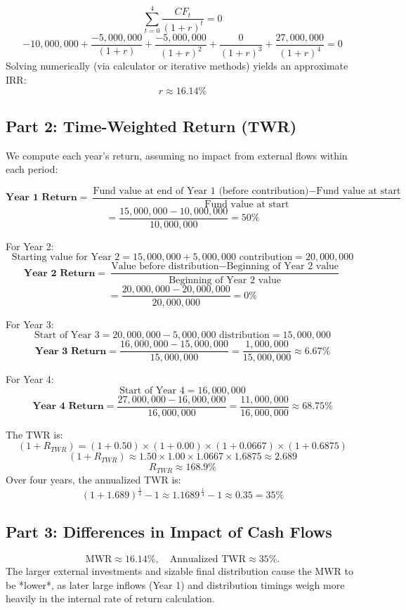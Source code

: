 \[
\sum_{t=0}^{4} \frac{CF_{t}}{(1 + r)^{t}} = 0
\]
\[
-10{,}000{,}000 + \frac{-5{,}000{,}000}{(1 + r)} + \frac{-5{,}000{,}000}{(1 + r)^{2}} + \frac{0}{(1 + r)^{3}} + \frac{27{,}000{,}000}{(1 + r)^{4}} = 0
\]
Solving numerically (via calculator or iterative methods) yields an approximate IRR:
\[
r \approx 16.14\%
\]

\subsection*{Part 2: Time-Weighted Return (TWR)}

We compute each year’s return, assuming no impact from external flows within each period:

\[
\textbf{Year 1 Return} = \frac{\text{Fund value at end of Year 1 (before contribution)} - \text{Fund value at start}}{\text{Fund value at start}}
\]
\[
= \frac{15{,}000{,}000 - 10{,}000{,}000}{10{,}000{,}000} = 50\%
\]

For Year 2:
\[
\text{Starting value for Year 2} = 15{,}000{,}000 + 5{,}000{,}000 \text{ contribution} = 20{,}000{,}000
\]
\[
\textbf{Year 2 Return} = \frac{\text{Value before distribution} - \text{Beginning of Year 2 value}}{\text{Beginning of Year 2 value}}
\]
\[
= \frac{20{,}000{,}000 - 20{,}000{,}000}{20{,}000{,}000} = 0\%
\]

For Year 3:
\[
\text{Start of Year 3} = 20{,}000{,}000 - 5{,}000{,}000 \text{ distribution} = 15{,}000{,}000
\]
\[
\textbf{Year 3 Return} = \frac{16{,}000{,}000 - 15{,}000{,}000}{15{,}000{,}000} = \frac{1{,}000{,}000}{15{,}000{,}000} \approx 6.67\%
\]

For Year 4:
\[
\text{Start of Year 4} = 16{,}000{,}000
\]
\[
\textbf{Year 4 Return} = \frac{27{,}000{,}000 - 16{,}000{,}000}{16{,}000{,}000} = \frac{11{,}000{,}000}{16{,}000{,}000} \approx 68.75\%
\]

The TWR is:
\[
(1 + R_{TWR}) = (1 + 0.50) \times (1 + 0.00) \times (1 + 0.0667) \times (1 + 0.6875)
\]
\[
(1 + R_{TWR}) \approx 1.50 \times 1.00 \times 1.0667 \times 1.6875 \approx 2.689
\]
\[
R_{TWR} \approx 168.9\%
\]
Over four years, the annualized TWR is:
\[
\left(1 + 1.689\right)^{\frac{1}{4}} - 1 \approx 1.1689^{\,\frac{1}{4}} - 1 \approx 0.35 = 35\%
\]

\subsection*{Part 3: Differences in Impact of Cash Flows}

\[
\text{MWR} \approx 16.14\%, \quad \text{Annualized TWR} \approx 35\%.
\]
The larger external investments and sizable final distribution cause the MWR to be *lower*, as later large inflows (Year 1) and distribution timings weigh more heavily in the internal rate of return calculation.

